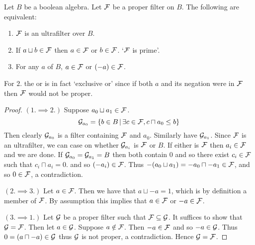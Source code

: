 \begin{prop}
    Let $B$ be a boolean algebra. 
    Let $\mathcal{F}$ be a proper filter on $B$.
    The following are equivalent:
    \begin{enumerate}
        \item $\mathcal{F}$ is an ultrafilter over $B$.
        \item If $a \sqcup b \in \mathcal{F}$ then $a \in \mathcal{F}$ or $b \in \mathcal{F}$.
            `$\mathcal{F}$ is prime'.
        \item For any $a$ of $B$, 
            $a \in \mathcal{F}$ or $(- a) \in \mathcal{F}$.
    \end{enumerate}
    For $2.$ the or is in fact `exclusive or' since if both $a$ 
    and its negation were in $\mathcal{F}$ then $\mathcal{F}$ would not be proper.
\end{prop}
\begin{proof}
    $(1. \implies 2.)$
        Suppose $a_0 \sqcup a_1 \in \mathcal{F}$.
        \[\mathcal{G}_{a_0} = \left\{b \in B \,|\, \exists c \in \mathcal{F}, c \sqcap a_0 \leq b\right\}\]
        Then clearly $\mathcal{G}_{a_0}$ is a filter containing $\mathcal{F}$ and $a_0$.
        Similarly have $\mathcal{G}_{a_1}$.
        Since $\mathcal{F}$ is an ultrafilter, 
        we can case on whether $\mathcal{G}_{a_i}$ is $\mathcal{F}$ or $B$.
        If either is $\mathcal{F}$ then $a_i \in \mathcal{F}$ and we are done.
        If $\mathcal{G}_{a_0} = \mathcal{G}_{a_1} = B$ then both contain $0$ and so 
        there exist $c_i \in \mathcal{F}$ such that 
        $c_i \sqcap a_i = 0$.
        and so $(- a_i) \in \mathcal{F}$.
        Thus $- (a_0 \sqcup a_1) = - a_0 \sqcap - a_1 \in \mathcal{F}$,
        and so $0 \in \mathcal{F}$,
        a contradiction.

    $(2. \implies 3.)$ 
        Let $a \in \mathcal{F}$.
        Then we have that $a \sqcup - a = 1$, 
        which is by definition a member of $\mathcal{F}$.
        By assumption this implies that $a \in \mathcal{F}$ or $- a \in \mathcal{F}$.
    
    $(3. \implies 1.)$
        Let $\mathcal{G}$ be a proper filter such that $\mathcal{F} \subseteq \mathcal{G}$.
        It suffices to show that $\mathcal{G} = \mathcal{F}$.
        Then let $a \in \mathcal{G}$.
        Suppose $a \notin \mathcal{F}$.
        Then $- a \in \mathcal{F}$ and so $- a \in \mathcal{G}$.
        Thus $0 = (a \sqcap - a) \in \mathcal{G}$ 
        thus $\mathcal{G}$ is not proper, a contradiction.
        Hence $\mathcal{G} = \mathcal{F}$.
\end{proof}

\begin{prop}
\end{prop}


